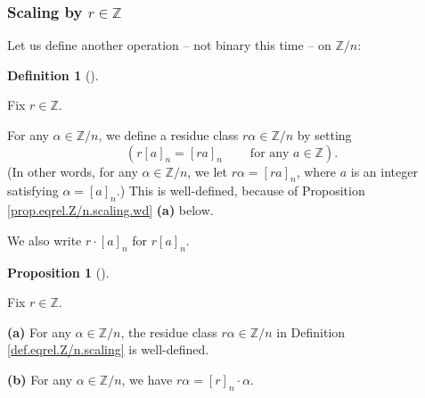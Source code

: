 \documentclass[numbers=enddot,12pt,final,onecolumn,notitlepage]{scrartcl}%
\numberwithin{exer}{subsection}
\theoremstyle{definition}
\newtheorem{prop}[theo]{Proposition}
\newenvironment{proposition}[1][]
{\begin{prop}[#1]\begin{leftbar}}
{\end{leftbar}\end{prop}}
\newtheorem{defi}[theo]{Definition}
\newenvironment{definition}[1][]
{\begin{defi}[#1]\begin{leftbar}}
{\end{leftbar}\end{defi}}
\begin{document}
\subsubsection{Scaling by $r\in\mathbb{Z}$}

Let us define another operation -- not binary this time -- on $\mathbb{Z}/n$:

\begin{definition}
\label{def.eqrel.Z/n.scaling}Fix $r\in\mathbb{Z}$.

For any $\alpha\in\mathbb{Z}/n$, we define a residue class $r\alpha
\in\mathbb{Z}/n$ by setting
\[
\left(  r\left[  a\right]  _{n}=\left[  ra\right]  _{n}%
\ \ \ \ \ \ \ \ \ \ \text{for any }a\in\mathbb{Z}\right)  .
\]
(In other words, for any $\alpha\in\mathbb{Z}/n$, we let $r\alpha=\left[
ra\right]  _{n}$, where $a$ is an integer satisfying $\alpha=\left[  a\right]
_{n}$.) This is well-defined, because of Proposition
\ref{prop.eqrel.Z/n.scaling.wd} \textbf{(a)} below.

We also write $r\cdot\left[  a\right]  _{n}$ for $r\left[  a\right]  _{n}$.
\end{definition}

\begin{proposition}
\label{prop.eqrel.Z/n.scaling.wd}Fix $r\in\mathbb{Z}$.

\textbf{(a)} For any $\alpha\in\mathbb{Z}/n$, the residue class $r\alpha
\in\mathbb{Z}/n$ in Definition \ref{def.eqrel.Z/n.scaling} is well-defined.

\textbf{(b)} For any $\alpha\in\mathbb{Z}/n$, we have $r\alpha=\left[
r\right]  _{n}\cdot\alpha$.
\end{proposition}
\end{document}
